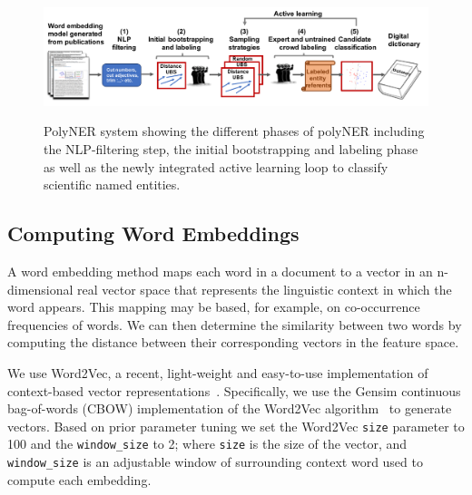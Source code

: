 \begin{figure}[!t]
{\includegraphics[width=\textwidth]{figures/architecture.pdf}}
\caption{\label{fig:architecture} PolyNER system showing the different phases of polyNER including the NLP-filtering step, the initial bootstrapping and labeling phase as well as the newly integrated active learning loop to classify scientific named entities. 
}
\end{figure}

\subsection{Computing Word Embeddings}\label{sec:wordembeddings}
A word embedding method maps each word
in a document to a vector in an n-dimensional real vector space that
represents the linguistic context in which the word appears. This mapping may
be based, for example, on co-occurrence frequencies of words. 
We can then determine the similarity between two words by computing the distance between
their corresponding vectors in the feature space.

We use Word2Vec, a recent, light-weight and easy-to-use implementation of context-based vector representations~\cite{mikolov2013efficient,mikolov2013distributed}.
Specifically, we use the Gensim continuous bag-of-words
(CBOW) implementation of the Word2Vec
algorithm~\cite{rehurek2010software} to generate vectors.
Based on prior parameter tuning we set the 
Word2Vec \texttt{size} parameter to 100 and the \texttt{window_size} to 2; 
where \texttt{size}  is the size of the vector, and \texttt{window_size}
is an adjustable window of surrounding context word used to compute each embedding.

